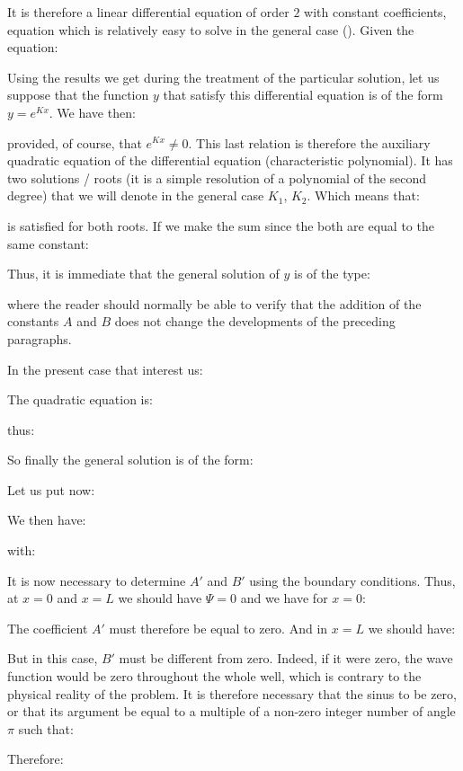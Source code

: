	It is therefore a linear differential equation of order $2$ with constant coefficients, equation which is relatively easy to solve in the general case (). Given the equation:
	
	Using the results we get during the treatment of the particular solution, let us suppose that the function $y$ that satisfy this differential equation is of the form $y=e^{Kx}$. We have then:
	
	provided, of course, that $e^{Kx}\neq 0$. This last relation is therefore the auxiliary quadratic equation of the differential equation (characteristic polynomial). It has two solutions / roots (it is a simple resolution of a polynomial of the second degree) that we will denote in the general case $K_1$, $K_2$. Which means that:
	
	is satisfied for both roots. If we make the sum since the both are equal to the same constant:
	
	Thus, it is immediate that the general solution of $y$ is of the type:
	
	where the reader should normally be able to verify that the addition of the constants $A$ and $B$ does not change the developments of the preceding paragraphs.

	In the present case that interest us:
	
	The quadratic equation is:
	
	thus:
	
	So finally the general solution is of the form:
	
	Let us put now:
	
	We then have:
	
	with:
	
	It is now necessary to determine $A'$ and $B'$ using the boundary conditions. Thus, at $x = 0$ and $x = L$ we should have $\Psi=0$ and we have for $x = 0$:
	
	The coefficient $A'$ must therefore be equal to zero. And in $x = L$ we should have:
	
	But in this case, $B'$ must be different from zero. Indeed, if it were zero, the wave function would be zero throughout the whole well, which is contrary to the physical reality of the problem. It is therefore necessary that the sinus to be zero, or that its argument be equal to a multiple of a non-zero integer number of angle $\pi$ such that:
	
	Therefore:
	
